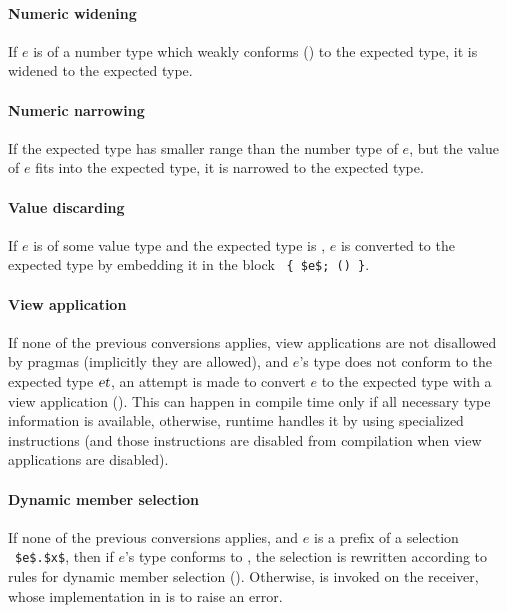 \paragraph{Numeric widening}
If $e$ is of a number type which weakly conforms () to the expected type, it is widened to the expected type. 

\paragraph{Numeric narrowing}
If the expected type has smaller range than the number type of $e$, but the value of $e$ fits into the expected type, it is narrowed to the expected type. 

\paragraph{Value discarding}
If $e$ is of some value type and the expected type is , $e$ is converted to the expected type by embedding it in the block ~\lstinline!{ $e$; () }!. 

\paragraph{View application}
If none of the previous conversions applies, view applications are not disallowed by pragmas (implicitly they are allowed), and $e$'s type does not conform to the expected type $\mbox{\sl et}$, an attempt is made to convert $e$ to the expected type with a view application (). This can happen in compile time only if all necessary type information is available, otherwise, runtime handles it by using specialized instructions (and those instructions are disabled from compilation when view applications are disabled). 

\paragraph{Dynamic member selection}
If none of the previous conversions applies, and $e$ is a prefix of a selection ~\lstinline!$e$.$x$!, then if $e$'s type conforms to , the selection is rewritten according to rules for dynamic member selection (). Otherwise,  is invoked on the receiver, whose implementation in  is to raise an error. 






